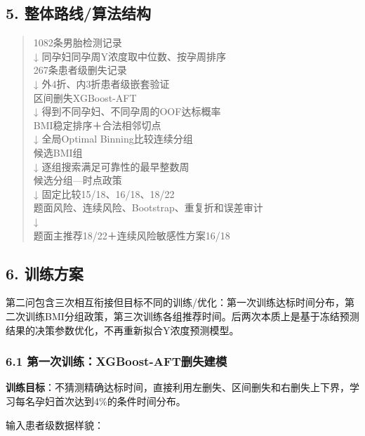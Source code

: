 \documentclass[UTF8,12pt,a4paper]{ctexart}
\begin{document}
\subsection{5. 整体路线/算法结构}
\begin{quote}\small\sffamily
1082条男胎检测记录\\
        ↓ 同孕妇同孕周Y浓度取中位数、按孕周排序\\
267条患者级删失记录\\
        ↓ 外4折、内3折患者级嵌套验证\\
区间删失XGBoost-AFT\\
        ↓ 得到不同孕妇、不同孕周的OOF达标概率\\
BMI稳定排序＋合法相邻切点\\
        ↓ 全局Optimal Binning比较连续分组\\
候选BMI组\\
        ↓ 逐组搜索满足可靠性的最早整数周\\
候选分组—时点政策\\
        ↓ 固定比较15/18、16/18、18/22\\
题面风险、连续风险、Bootstrap、重复折和误差审计\\
        ↓\\
题面主推荐18/22＋连续风险敏感性方案16/18\\
\end{quote}

\subsection{6. 训练方案}
第二问包含三次相互衔接但目标不同的训练/优化：第一次训练达标时间分布，第二次训练BMI分组政策，第三次训练各组推荐时间。后两次本质上是基于冻结预测结果的决策参数优化，不再重新拟合Y浓度预测模型。

\subsubsection{6.1 第一次训练：XGBoost-AFT删失建模}
\textbf{训练目标}：不猜测精确达标时间，直接利用左删失、区间删失和右删失上下界，学习每名孕妇首次达到4\%的条件时间分布。

输入患者级数据样貌：
\end{document}
